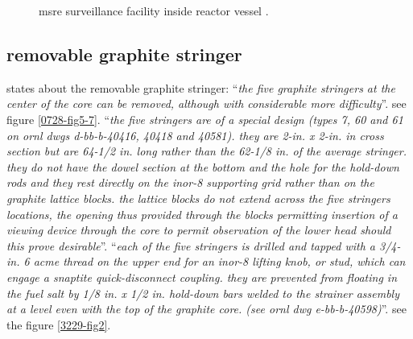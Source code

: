 \documentclass{article}
\begin{document}
\begin{preview}
\begin{figure}[H]
  \centering
  \centering
  \caption{msre surveillance facility inside reactor vessel \parencite[figure 5.14]{ornl-tm-3229}.}
  \label{3039-fig5-11}
\end{figure}

\subsection{removable graphite stringer}
\parencite[page 84]{ornl-tm-0728} states about the removable graphite stringer:
\enquote{\textit{the five graphite stringers at the center of the core can be removed, although with considerable more difficulty}}. see figure \ref{0728-fig5-7}. \enquote{\textit{the five stringers are of a special design (types 7, 60 and 61 on ornl dwgs d-bb-b-40416, 40418 and 40581). they are 2-in. x 2-in. in cross section but are 64-1/2 in. long rather than the 62-1/8 in. of the average stringer. they do not have the dowel section at the bottom and the hole for the hold-down rods and they rest directly on the inor-8 supporting grid rather than on the graphite lattice blocks. the lattice blocks do not extend across the five stringers locations, the opening thus provided through the blocks permitting insertion of a viewing device through the core to permit observation of the lower head should this prove desirable}}.
\enquote{\textit{each of the five stringers is drilled and tapped with a 3/4-in. 6 acme thread on the upper end for an inor-8 lifting knob, or stud, which can engage a snaptite quick-disconnect coupling. they are prevented from floating in the fuel salt by 1/8 in. x 1/2 in. hold-down bars welded to the strainer assembly at a level even with the top of the graphite core. (see ornl dwg e-bb-b-40598)}}. see the figure \ref{3229-fig2}.






\printbibliography

\end{preview}
\end{document}
